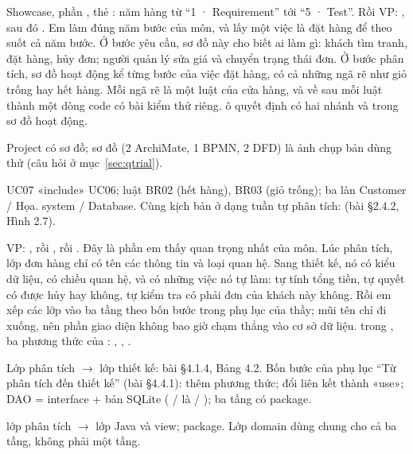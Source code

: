 {Showcase, phần , thẻ : năm hàng từ ``1 · Requirement'' tới ``5 · Test''. Rồi VP: , sau đó .}
{Em làm đúng năm bước của môn, và lấy một việc là đặt hàng để theo suốt cả năm bước.  Ở bước yêu cầu, sơ đồ này cho biết ai làm gì: khách tìm tranh, đặt hàng, hủy đơn; người quản lý sửa giá và chuyển trạng thái đơn.  Ở bước phân tích, sơ đồ hoạt động kể từng bước của việc đặt hàng, có cả những ngã rẽ như giỏ trống hay hết hàng. Mỗi ngã rẽ là một luật của cửa hàng, và về sau mỗi luật thành một dòng code có bài kiểm thử riêng.}
{ô quyết định có hai nhánh  và  trong sơ đồ hoạt động.}
{\item Project có \factDiagrams{} sơ đồ; \factTrial{} sơ đồ (2 ArchiMate, 1 BPMN, 2 DFD) là ảnh chụp bản dùng thử (câu hỏi ở mục~\ref{sec:qtrial}).
 \item UC07 «include» UC06; luật BR02 (hết hàng), BR03 (giỏ trống); ba làn Customer / Họa. system / Database. Cùng kịch bản ở dạng tuần tự phân tích:  (bài §2.4.2, Hình 2.7).}

{VP: , rồi , rồi .}
{Đây là phần em thấy quan trọng nhất của môn. Lúc phân tích, lớp đơn hàng chỉ có tên các thông tin và loại quan hệ. Sang thiết kế, nó có kiểu dữ liệu, có chiều quan hệ, và có những việc nó tự làm: tự tính tổng tiền, tự quyết có được hủy hay không, tự kiểm tra có phải đơn của khách này không. Rồi em xếp các lớp vào ba tầng theo bốn bước trong phụ lục của thầy; mũi tên chỉ đi xuống, nên phần giao diện không bao giờ chạm thẳng vào cơ sở dữ liệu.}
{trong , ba phương thức của : , , .}
{\item Lớp phân tích $\to$ lớp thiết kế: bài §4.1.4, Bảng 4.2. Bốn bước của phụ lục ``Từ phân tích đến thiết kế'' (bài §4.4.1): thêm phương thức; đổi liên kết thành «use»; DAO = interface + bản SQLite ( /  là  / ); ba tầng có package.
 \item \factAnalysis{} lớp phân tích $\to$ \factJavaClasses{} lớp Java và \factJsViews{} view; \factPackages{} package. Lớp domain dùng chung cho cả ba tầng, không phải một tầng.}

